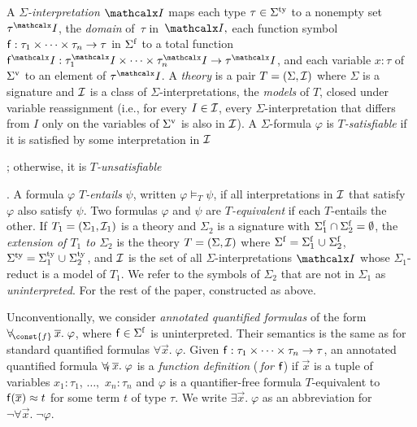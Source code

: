 A \emph{$\Sigma$-interpretation $\I$} %
maps each type $\tau \in \stypes{\Sigma}$ to a nonempty set $\tau^\I$,
the \emph{domain} of~$\tau$ in~$\I,$
each function symbol $\mathsf{f} : \tau_1 \times \cdots \times \tau_n \rightarrow \tau$ in $\sfuns{\Sigma}$
to a total function $\con{f}^\I : \tau_1^\I \times \cdots \times \tau_n^\I \rightarrow \tau^\I$,
and each variable $x:\tau$ of $\svars{\Sigma}$ to an element of $\tau^\I$.
A \emph{theory} is a pair $T = (\Sigma, \Mo)$ where
$\Sigma$ is a signature and ${\mathcal{I}}$ is a class of $\Sigma$-interpretations,
the \emph{models} of $T$, closed under variable reassignment
(i.e., for every $I \in {\mathcal{I}}$, every $\Sigma$-interpretation that differs
from $I$ only on the variables of $\svars \Sigma$ is also in ${\mathcal{I}}$).
A $\Sigma$-formula $\varphi$ is \emph{$T$-satisfiable}
if it is satisfied by some interpretation in ${\mathcal{I}}$\begin{rep};
otherwise, it is \emph{$T$-unsatisfiable}\end{rep}.
A formula $\varphi$ \emph{$T$-entails} $\psi$, written $\varphi \models_T \psi$,
if all interpretations in ${\mathcal{I}}$ that satisfy $\varphi$ also satisfy $\psi$.
Two formulas $\varphi$ and $\psi$ are \emph{$T$-equivalent} 
if each $T$-entails the other.
If $T_1 = (\Sigma_1, \Mo_1)$ is a theory and $\Sigma_2$ is a signature 
with $\sfuns{\Sigma_1} \cap \sfuns{\Sigma_2} = \emptyset$,
the \emph{extension of $T_1$ to $\Sigma_2$} is the theory $T = (\Sigma, \Mo)$ where 
$\sfuns{\Sigma} = \sfuns{\Sigma_1} \cup \sfuns{\Sigma_2}$,
$\stypes{\Sigma} = \stypes{\Sigma_1} \cup \stypes{\Sigma_2}$,
and ${\mathcal{I}}$ is the set of all $\Sigma$-interpretations $\I$
whose $\Sigma_1$-reduct is a model of $T_1$.
We refer to the symbols of $\Sigma_2$ that are not in $\Sigma_1$ as \emph{uninterpreted}.
For the rest of the paper,  constructed as above.

Unconventionally,
we consider \emph{annotated quantified formulas} of the form
$\forallf{\const{f}} \vec x.\; \varphi$, where $\con{f} \in \sfuns{\Sigma}$ is
uninterpreted. Their
semantics is the same as for standard quantified formulas $\forall \vec x.\; \varphi$.
Given $\mathsf{f} : \tau_1 \times \cdots \times \tau_n \rightarrow \tau$,
an annotated
quantified formula $\forall_{\!\mathsf{f}\:} \overline{x}.\; \varphi$ is a \emph{function definition}
(\,\emph{for $\mathsf{f}$}\vthinspace) if $\vec x$ is a tuple of variables
$x_1 : \tau_1$, $\ldots,$ $x_n : \tau_n$
and $\varphi$ is a quantifier-free formula 
$T$-equivalent to $\mathsf{f}( \overline{x} ) \approx t$ for some term $t$ of type $\tau$.
We write $\exists
\vec x.\; \varphi$ as an abbreviation for $\neg \forall \vec x.\; \neg \varphi$.

